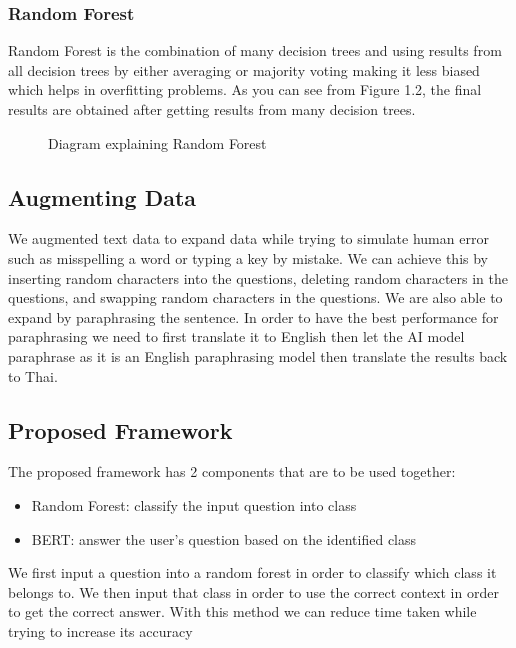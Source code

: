 \documentclass[12pt,oneside,openright,a4paper]{cpe-english-project}
\begin{document}
        \subsubsection{Random Forest}
          \qquad Random Forest is the combination of many decision trees and using results from all decision trees by either averaging or majority voting making it less biased which helps in overfitting problems. As you can see from Figure 1.2, the final results are obtained after getting results from many decision trees.\par
          \begin{figure}[!h]
            \centering
            \caption{Diagram explaining Random Forest}\label{fig:Random_Forest}
          \end{figure}
    \subsection{Augmenting Data}
      \qquad We augmented text data to expand data while trying to simulate human error such as misspelling a word or typing a key by mistake. We can achieve this by inserting random characters into the questions, deleting random characters in the questions, and swapping random characters in the questions. We are also able to expand by paraphrasing the sentence. In order to have the best performance for paraphrasing we need to first translate it to English then let the AI model\cite{huggingface2} paraphrase as it is an English paraphrasing model then translate the results back to Thai.\par
    \subsection{Proposed Framework}
      \qquad The proposed framework has 2 components that are to be used together:\par
      \begin{itemize}
        \item Random Forest: classify the input question into class
        \item BERT: answer the user's question based on the identified class
      \end{itemize}
      \qquad We first input a question into a random forest in order to classify which class it belongs to. We then input that class in order to use the correct context in order to get the correct answer. With this method we can reduce time taken while trying to increase its accuracy\par
\end{document}
